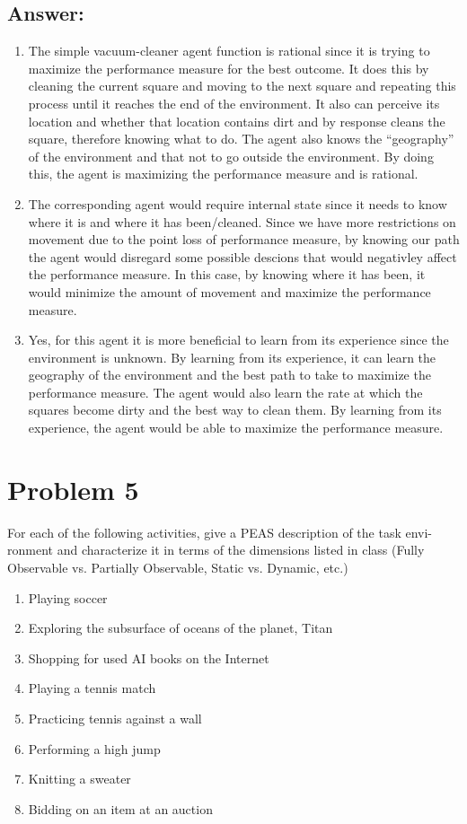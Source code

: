 \documentclass{article}
\begin{document}
\subsection*{Answer:}
\begin{enumerate}[label= (\alph*)]
    \item The simple vacuum-cleaner agent function is rational since it is trying to maximize the performance measure for the best outcome. It does this by cleaning the current square and moving to the next square and repeating this process until it reaches the end of the environment. It also can perceive its location and whether that location contains dirt and by response cleans the square, therefore knowing what to do. The agent also knows the ``geography'' of the environment and that not to go outside the environment. By doing this, the agent is maximizing the performance measure and is rational.
    \item The corresponding agent would require internal state since it needs to know where it is and where it has been/cleaned. Since we have more restrictions on movement due to the point loss of performance measure, by knowing our path the agent would disregard some possible descions that would negativley affect the performance measure. In this case, by knowing where it has been, it would minimize the amount of movement and maximize the performance measure.
    \item Yes, for this agent it is more beneficial to learn from its experience since the environment is unknown. By learning from its experience, it can learn the geography of the environment and the best path to take to maximize the performance measure. The agent would also learn the rate at which the squares become dirty and the best way to clean them. By learning from its experience, the agent would be able to maximize the performance measure.
\end{enumerate}

\section*{Problem 5}
For each of the following activities, give a PEAS description of the task envi- ronment and characterize it in terms of the dimensions listed in class (Fully Observable vs. Partially Observable, Static vs. Dynamic, etc.)

\begin{enumerate}[label= (\alph*)]
    \item Playing soccer
    \item Exploring the subsurface of oceans of the planet, Titan
    \item Shopping for used AI books on the Internet
    \item Playing a tennis match
    \item Practicing tennis against a wall
    \item Performing a high jump
    \item Knitting a sweater
    \item Bidding on an item at an auction
\end{enumerate}
\end{document}
